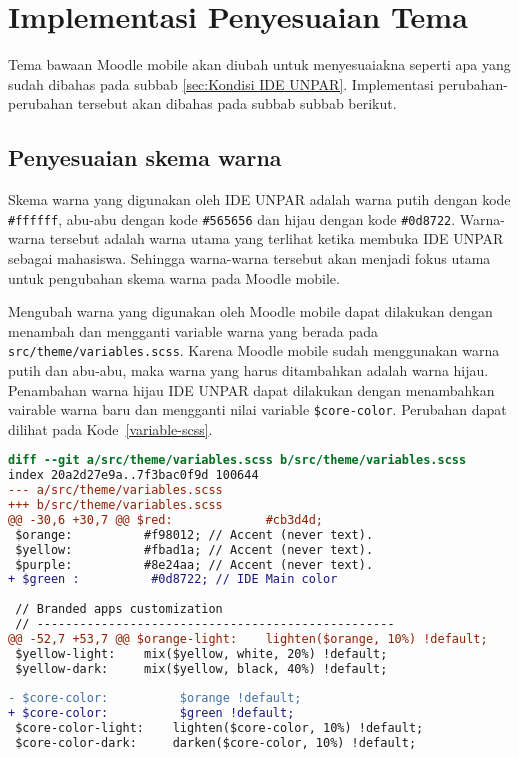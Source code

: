 \section{Implementasi Penyesuaian Tema}
Tema bawaan Moodle mobile akan diubah untuk menyesuaiakna seperti apa yang sudah dibahas pada subbab \ref{sec:Kondisi IDE UNPAR}. Implementasi perubahan-perubahan tersebut akan dibahas pada subbab subbab berikut.

\subsection{Penyesuaian skema warna}
Skema warna yang digunakan oleh IDE UNPAR adalah warna putih dengan kode \texttt{\#ffffff}, abu-abu dengan kode \texttt{\#565656} dan hijau dengan kode \texttt{\#0d8722}.  Warna-warna tersebut adalah warna utama yang terlihat ketika membuka IDE UNPAR sebagai mahasiswa. Sehingga warna-warna tersebut akan menjadi fokus utama untuk pengubahan skema warna pada Moodle mobile.

Mengubah warna yang digunakan oleh Moodle mobile dapat dilakukan dengan menambah dan mengganti variable warna yang berada pada \texttt{src/theme/variables.scss}. Karena Moodle mobile sudah menggunakan warna putih dan abu-abu, maka warna yang harus ditambahkan adalah warna hijau. Penambahan warna hijau IDE UNPAR dapat dilakukan dengan menambahkan vairable warna baru dan mengganti nilai variable \texttt{\$core-color}. Perubahan dapat dilihat pada \mbox{Kode \ref{variable-scss}}.

\begin{lstlisting}[language = diff, frame=single, label ={variable-scss}, caption = Mengubah warna utama menjadi warna hijau ]
diff --git a/src/theme/variables.scss b/src/theme/variables.scss
index 20a2d27e9a..7f3bac0f9d 100644
--- a/src/theme/variables.scss
+++ b/src/theme/variables.scss
@@ -30,6 +30,7 @@ $red:             #cb3d4d;
 $orange:          #f98012; // Accent (never text).
 $yellow:          #fbad1a; // Accent (never text).
 $purple:          #8e24aa; // Accent (never text).
+ $green :          #0d8722; // IDE Main color
 
 // Branded apps customization
 // --------------------------------------------------
@@ -52,7 +53,7 @@ $orange-light:    lighten($orange, 10%) !default;
 $yellow-light:    mix($yellow, white, 20%) !default;
 $yellow-dark:     mix($yellow, black, 40%) !default;
 
- $core-color:          $orange !default;
+ $core-color:          $green !default;
 $core-color-light:    lighten($core-color, 10%) !default;
 $core-color-dark:     darken($core-color, 10%) !default;
\end{lstlisting}

